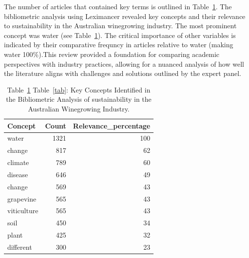 \documentclass[fleqn,10pt]{wlscirep}
\begin{document}
The number of articles that contained key terms is outlined in Table~\ref{tab:lexi}. The bibliometric analysis using Leximancer revealed key concepts and their relevance to sustainability in the Australian winegrowing industry. The most prominent concept was water (see Table~\ref{tab:lexi}). The critical importance of other variables is indicated by their comparative frequncy in articles relative to water (making water 100\%).This review provided a foundation for comparing academic perspectives with industry practices, allowing for a nuanced analysis of how well the literature aligns with challenges and solutions outlined by the expert panel.
\begin{table}[h]
    \begin{tabular}{@{}lrr@{}}
    \toprule
    \textbf{Concept} & \multicolumn{1}{l}{\textbf{Count}} & \multicolumn{1}{l}{\textbf{Relevance_percentage}} \\ \midrule
    water & 1321 & 100 \\
    change & 817 & 62 \\
    climate & 789 & 60 \\
    disease & 646 & 49 \\
    change & 569 & 43 \\
    grapevine & 565 & 43 \\
    viticulture & 565 & 43 \\
    soil & 450 & 34 \\
    plant & 425 & 32 \\
    different & 300 & 23 \\ \bottomrule
    \end{tabular}
    \caption{Table~\ref{tab:lexi} Table~\ref{tab}: Key Concepts Identified in the Bibliometric Analysis of sustainability in the Australian Winegrowing Industry.}\label{tab:lexi}
\end{table}
% 
\end{document}
